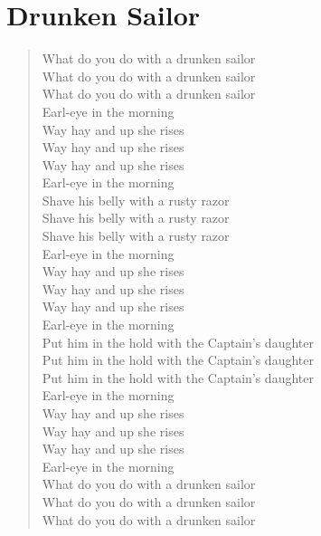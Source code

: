 \documentclass[11pt]{article}
\begin{document}
\section{Drunken Sailor}
\label{sec:orgde43a60}
\begin{verse}
\vspace*{1em}
What do you do with a drunken sailor\\
What do you do with a drunken sailor\\
What do you do with a drunken sailor\\
Earl-eye in the morning\\
\vspace*{1em}
Way hay and up she rises\\
Way hay and up she rises\\
Way hay and up she rises\\
Earl-eye in the morning\\
\vspace*{1em}
Shave his belly with a rusty razor\\
Shave his belly with a rusty razor\\
Shave his belly with a rusty razor\\
Earl-eye in the morning\\
\vspace*{1em}
Way hay and up she rises\\
Way hay and up she rises\\
Way hay and up she rises\\
Earl-eye in the morning\\
\vspace*{1em}
Put him in the hold with the Captain's daughter\\
Put him in the hold with the Captain's daughter\\
Put him in the hold with the Captain's daughter\\
Earl-eye in the morning\\
\vspace*{1em}
Way hay and up she rises\\
Way hay and up she rises\\
Way hay and up she rises\\
Earl-eye in the morning\\
\vspace*{1em}
What do you do with a drunken sailor\\
What do you do with a drunken sailor\\
What do you do with a drunken sailor\\

\end{verse}
\end{document}
